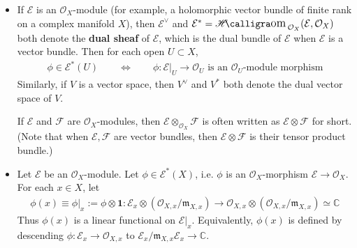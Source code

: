 \documentclass[11pt,b5paper,notitlepage]{article}
\theoremstyle{definition}
\theoremstyle{plain}
\newcommand{\fk}{\mathfrak}
\newcommand{\mc}{\mathcal}
\newcommand{\idt}{\mathbf{1}}
\newcommand{\Cbb}{\mathbb C}
\newcommand{\<}{\left\langle}
\renewcommand{\>}{\right\rangle}
\newcommand{\ME}{\mathcal{E}}
\newcommand{\fm}{\mathfrak{m}}
\newcommand{\MF}{\mathcal{F}}
\newcommand{\mk}{\mathfrak m}
\DeclareMathOperator{\shom}{\mathscr{H}\text{\kern -3pt {\calligra\large om}}\,}
\numberwithin{equation}{section}
\begin{document}
\begin{subappendices}
\begin{itemize}
\begin{align}\label{eq6}
    \MF\vert_x=\frac{\MF_x}{\fm_{X,x}\cdot \MF_x}\simeq\mc F_x\otimes_{\mc O_{X_x}}(\mc O_{X,x}/\fk m_{X,x})
\end{align}
    is the fiber of $\MF$ at $x$, which is a vector space. The residue class of $s\in\mc F$ in $\mc F|_x$ is denoted by $s(x)$ or $s|_x$:
\begin{align}
s(x)\equiv s|_x\qquad\in\mc F|_x  \label{eq9}
\end{align}
Equivalently,
\begin{align}
s(x)=s\otimes 1\in \mc F_x\otimes(\mc O_{X,x}/\fk m_{X,x})
\end{align}



    \item If $\ME$ is an $\mc O_X$-module (for example, a holomorphic vector bundle of finite rank on a complex manifold $X$), then $\ME^\vee$ and $\ME^*=\shom_{\mc O_X}(\mc E,\mc O_X)$ both denote the \textbf{dual sheaf} of $\ME$, which is the dual bundle of $\mc E$ when $\mc E$ is a vector bundle. Then for each open $U\subset X$,
\begin{align}
\phi\in\mc E^*(U)\qquad\Longleftrightarrow \qquad\phi:\mc E|_U\rightarrow \mc O_U\text{ is an $\mc O_U$-module morphism}   \label{eq18}
\end{align}
Similarly, if $V$ is a vector space, then $V^\vee$ and $V^*$ both denote the dual vector space of $V$.

If $\mc E$ and $\mc F$ are $\mc O_X$-modules, then $\mc E\otimes_{\mc O_X}\mc F$ is often written as $\mc E\otimes\mc F$ for short. (Note that when $\mc E,\mc F$ are vector bundles, then $\mc E\otimes \mc F$ is their tensor product bundle.)

\item Let $\mc E$ be an $\mc O_X$-module. Let $\phi\in\mc E^*(X)$, i.e. $\phi$ is an $\mc O_X$-morphism $\mc E\rightarrow\mc O_X$. For each $x\in X$, let
\begin{align}\label{eq19}
\phi(x)\equiv\phi|_x:=\phi\otimes\idt: \mc E_x\otimes (\mc O_{X,x}/\mk_{X,x})\rightarrow \mc O_{X,x}\otimes (\mc O_{X,x}/\mk_{X,x})\simeq\Cbb
\end{align}
Thus $\phi(x)$ is a linear functional on $\mc E|_x$. Equivalently, $\phi(x)$ is defined by descending $\phi:\mc E_x\rightarrow\mc O_{X,x}$ to $\mc E_x/{\mk_{X,x}\mc E_x}\rightarrow\Cbb$.


\end{itemize}
\end{subappendices}
\end{document}
